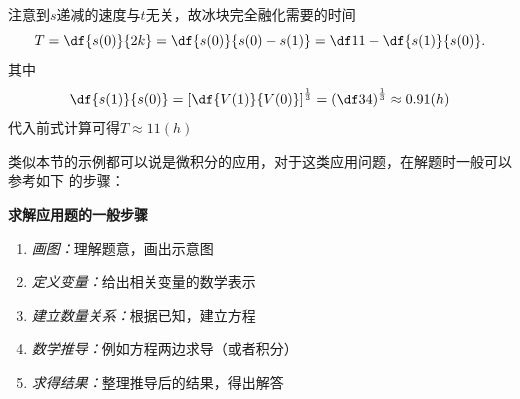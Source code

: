 注意到$s$递减的速度与$t$无关，故冰块完全融化需要的时间
$$T=\df{s(0)}{2k}=\df{s(0)}{s(0)-s(1)}=\df1{1-\df{s(1)}{s(0)}}.$$
其中
$$\df{s(1)}{s(0)}=\left[\df{V(1)}{V(0)}\right]^{\frac13}=
\left(\df34\right)^{\frac13}\approx0.91(h)$$
代入前式计算可得$T\approx11(h)$

类似本节的示例都可以说是微积分的应用，对于这类应用问题，在解题时一般可以参考如下
的步骤：
\begin{thx}
	{\bf 求解应用题的一般步骤}
	\begin{enumerate}
	  \setlength{\itemindent}{1cm}
	  \item {{\it 画图：}}理解题意，画出示意图
	  \item {{\it 定义变量：}}给出相关变量的数学表示
	  \item {{\it 建立数量关系：}}根据已知，建立方程
	  \item {{\it 数学推导：}}例如方程两边求导（或者积分）
	  \item {{\it 求得结果：}}整理推导后的结果，得出解答
	\end{enumerate}
\end{thx}


